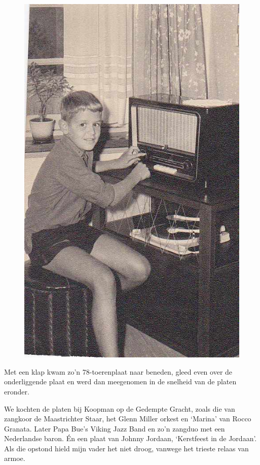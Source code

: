 \documentclass[10pt,twoside, openright]{memoir}
\begin{document}
\begin{figure}
\includegraphics[width=\textwidth]{img/93jeugdfotoos_0010A}
\end{figure}

Met een klap kwam zo’n 78-toerenplaat naar beneden, gleed even over de onderliggende plaat en werd dan meegenomen in de snelheid van de platen eronder. 

We kochten de platen bij Koopman op de Gedempte Gracht, zoals die van zangkoor de Maastrichter Staar, het Glenn Miller orkest en `Marina' van Rocco Granata. Later Papa Bue’s Viking Jazz Band en zo’n zangduo met een Nederlandse baron. Én een plaat van Johnny Jordaan, ‘Kerstfeest in de Jordaan’. Als die opstond hield mijn vader het niet droog, vanwege het trieste relaas van armoe. 
\end{document}
